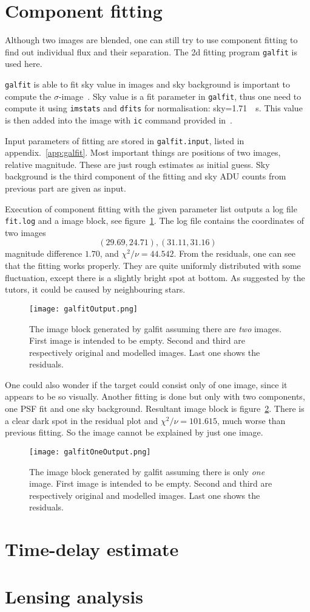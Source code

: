 \clearpage
\section{Component fitting}
Although two images are blended, one can still try to use component fitting to find out individual flux and their separation. The 2d fitting program \verb|galfit| is used here.

\verb|galfit| is able to fit sky value in images and sky background is important to compute the $\sigma$-image~\cite{galfitManual}. Sky value is a fit parameter in \verb|galfit|, thus one need to compute it using \verb|imstats| and \verb|dfits| for normalisation: sky=\SI{1.71}{\per\s}. This value is then added into the image with \verb|ic| command provided in~\cite{manual}.

Input parameters of fitting are stored in \verb|galfit.input|, listed in appendix.~\ref{app:galfit}. Most important things are positions of two images, relative magnitude. These are just rough estimates as initial guess. Sky background is the third component of the fitting and sky ADU counts from previous part are given as input.

Execution of component fitting with the given parameter list outputs a log file \verb|fit.log| and a image block, see figure~\ref{fig:galfitOut}. The log file contains the coordinates of two images
\begin{equation*}
	(29.69, 24.71), (31.11, 31.16)
\end{equation*}
magnitude difference $1.70$, and $\chi^2/\nu = \num{44.542}$. From the residuals, one can see that the fitting works properly. They are quite uniformly distributed with some fluctuation, except there is a slightly bright spot at bottom. As suggested by the tutors, it could be caused by neighbouring stars. 
\begin{figure}[ht]
	\centering
	\texttt{[image: galfitOutput.png]}
	\caption{The image block generated by galfit assuming there are \textit{two} images. First image is intended to be empty. Second and third are respectively original and modelled images. Last one shows the residuals.}%
	\label{fig:galfitOut}
\end{figure}

One could also wonder if the target could consist only of one image, since it appears to be so visually. Another fitting is done but only with two components, one PSF fit and one sky background. Resultant image block is figure~\ref{fig:galfitOneOut}. There is a clear dark spot in the residual plot and $\chi^2/\nu = 101.615$, much worse than previous fitting. So the image cannot be explained by just one image.
\begin{figure}[ht]
	\centering
	\texttt{[image: galfitOneOutput.png]}
	\caption{The image block generated by galfit assuming there is only \textit{one} image. First image is intended to be empty. Second and third are respectively original and modelled images. Last one shows the residuals.}%
	\label{fig:galfitOneOut}
\end{figure}

\section{Time-delay estimate} 

\section{Lensing analysis}
